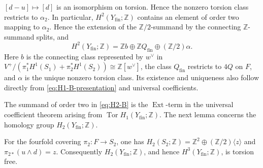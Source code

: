 $[d-u]\mapsto[d]$ is an isomorphism on torsion.  Hence the nonzero torsion
class restricts to $\alpha_2$.  In particular,
$H^2(Y_{\mathrm{fin}};\mathbb Z)$ contains an element of order two mapping to
$\alpha_2$.  Hence the extension of the $\mathbb Z/2$-summand by the
connecting $\mathbb Z$-summand splits, and
\begin{equation}\label{eq:H2-B}
 H^2(Y_{\mathrm{fin}};\mathbb Z)=
 \mathbb Z b\oplus\mathbb Z Q_{\mathrm{fin}}
 \oplus(\mathbb Z/2)\alpha.
\end{equation}
Here $b$ is the connecting class represented by $w^\vee$ in
$V^+/(\pi_1^*H^1(S_1)+\pi_2^*H^1(S_2))\cong\mathbb Z[w^\vee]$, the class
$Q_{\mathrm{fin}}$ restricts to $4Q$ on $F$, and $\alpha$ is the
unique nonzero torsion class.  Its existence and uniqueness also follow directly
from \eqref{eq:H1-B-presentation} and universal coefficients.

The summand of order two in \eqref{eq:H2-B} is the
$\operatorname{Ext}$-term in the universal coefficient theorem arising
from $\operatorname{Tor}H_1(Y_{\mathrm{fin}};\mathbb Z)$.
The next lemma concerns the homology group $H_2(Y_{\mathrm{fin}};\mathbb Z)$.

\begin{lemma}
\label{lem:fourfold-pushforward}
For the fourfold covering $\pi_2:F\to S_2$, one has
$H_2(S_2;\mathbb Z)=\mathbb Z^2\oplus
(\mathbb Z/2)\langle z\rangle$ and $\pi_{2*}(u\wedge d)=z$.
Consequently $H_2(Y_{\mathrm{fin}};\mathbb Z)$, and hence
$H^3(Y_{\mathrm{fin}};\mathbb Z)$, is torsion free.
\end{lemma}

